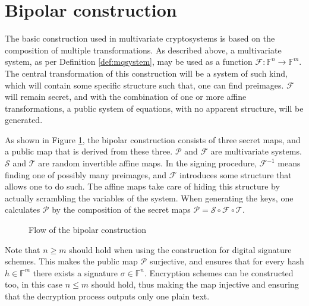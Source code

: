 \documentclass{ufsctex/ufsctex}
\begin{document}
\section{Bipolar construction}\label{sec:bipolar}

The basic construction used in multivariate cryptosystems is based on the
composition of multiple transformations. As described above, a multivariate
system, as per Definition \ref{def:mqsystem}, may be used as a function
$\mathcal{F}:\mathbb{F}^n\to\mathbb{F}^m$. The central transformation of this
construction will be a system of such kind, which will contain some specific
structure such that, one can find preimages. $\mathcal{F}$ will remain secret,
and with the combination of one or more affine transformations, a public system
of equations, with no apparent structure, will be generated.

As shown in Figure \ref{fig:bipolar}, the bipolar construction consists of
three secret maps, and a public map that is derived from these three.
$\mathcal{P}$ and $\mathcal{F}$ are multivariate systems. $\mathcal{S}$ and
$\mathcal{T}$ are random invertible affine maps. In the signing procedure,
$\mathcal{F}^{-1}$ means finding one of possibly many preimages, and
$\mathcal{F}$ introduces some structure that allows one to do such. The affine
maps take care of hiding this structure by actually scrambling the variables of
the system. When generating the keys, one calculates $\mathcal{P}$ by the
composition of the secret maps $\mathcal{P} = \mathcal{S} \circ \mathcal{F}
\circ \mathcal{T}$.

\begin{figure}
\centering
{}
\caption{Flow of the bipolar construction}\label{fig:bipolar}
\end{figure}

Note that $n \geq m$ should hold when using the construction for digital
signature schemes. This makes the public map $\mathcal{P}$ surjective, and
ensures that for every hash $h \in \mathbb{F}^m$ there exists a signature
$\sigma \in \mathbb{F}^n$. Encryption schemes can be constructed too, in this
case $n \leq m$ should hold, thus making the map injective and ensuring that
the decryption process outputs only one plain text.
\end{document}
